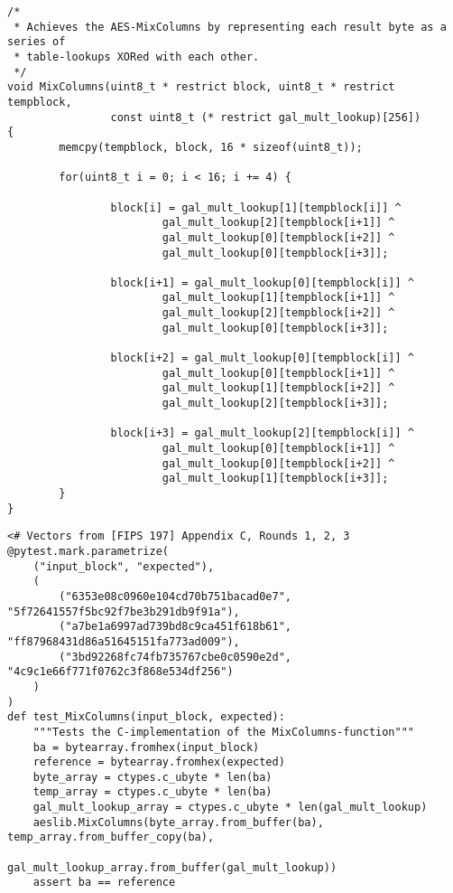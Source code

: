 \begin{lstlisting}
/*
 * Achieves the AES-MixColumns by representing each result byte as a series of
 * table-lookups XORed with each other.
 */
void MixColumns(uint8_t * restrict block, uint8_t * restrict tempblock, 
                const uint8_t (* restrict gal_mult_lookup)[256])
{
        memcpy(tempblock, block, 16 * sizeof(uint8_t));

        for(uint8_t i = 0; i < 16; i += 4) {

                block[i] = gal_mult_lookup[1][tempblock[i]] ^
                        gal_mult_lookup[2][tempblock[i+1]] ^
                        gal_mult_lookup[0][tempblock[i+2]] ^
                        gal_mult_lookup[0][tempblock[i+3]];

                block[i+1] = gal_mult_lookup[0][tempblock[i]] ^
                        gal_mult_lookup[1][tempblock[i+1]] ^
                        gal_mult_lookup[2][tempblock[i+2]] ^
                        gal_mult_lookup[0][tempblock[i+3]];

                block[i+2] = gal_mult_lookup[0][tempblock[i]] ^
                        gal_mult_lookup[0][tempblock[i+1]] ^
                        gal_mult_lookup[1][tempblock[i+2]] ^
                        gal_mult_lookup[2][tempblock[i+3]];

                block[i+3] = gal_mult_lookup[2][tempblock[i]] ^
                        gal_mult_lookup[0][tempblock[i+1]] ^
                        gal_mult_lookup[0][tempblock[i+2]] ^
                        gal_mult_lookup[1][tempblock[i+3]];
        }
}
\end{lstlisting}

\begin{lstlisting}
<# Vectors from [FIPS 197] Appendix C, Rounds 1, 2, 3
@pytest.mark.parametrize(
    ("input_block", "expected"),
    (
        ("6353e08c0960e104cd70b751bacad0e7", "5f72641557f5bc92f7be3b291db9f91a"),
        ("a7be1a6997ad739bd8c9ca451f618b61", "ff87968431d86a51645151fa773ad009"),
        ("3bd92268fc74fb735767cbe0c0590e2d", "4c9c1e66f771f0762c3f868e534df256")
    )
)
def test_MixColumns(input_block, expected):
    """Tests the C-implementation of the MixColumns-function"""
    ba = bytearray.fromhex(input_block)
    reference = bytearray.fromhex(expected)
    byte_array = ctypes.c_ubyte * len(ba)
    temp_array = ctypes.c_ubyte * len(ba)
    gal_mult_lookup_array = ctypes.c_ubyte * len(gal_mult_lookup)
    aeslib.MixColumns(byte_array.from_buffer(ba), temp_array.from_buffer_copy(ba),
                      gal_mult_lookup_array.from_buffer(gal_mult_lookup))
    assert ba == reference
\end{lstlisting}

